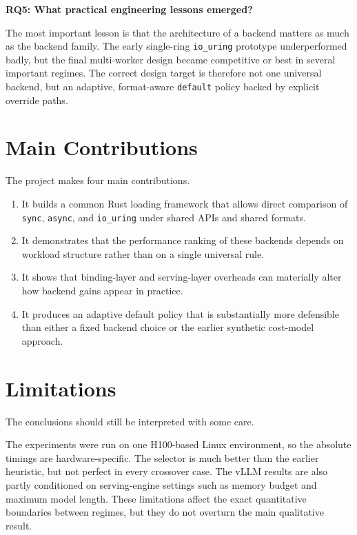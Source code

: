 \textbf{RQ5: What practical engineering lessons emerged?}

The most important lesson is that the architecture of a backend matters as much as the backend family. The early single-ring \texttt{io\_uring} prototype underperformed badly, but the final multi-worker design became competitive or best in several important regimes. The correct design target is therefore not one universal backend, but an adaptive, format-aware \texttt{default} policy backed by explicit override paths.

\section{Main Contributions}

The project makes four main contributions.

\begin{enumerate}
\item It builds a common Rust loading framework that allows direct comparison of \texttt{sync}, \texttt{async}, and \texttt{io\_uring} under shared APIs and shared formats.
\item It demonstrates that the performance ranking of these backends depends on workload structure rather than on a single universal rule.
\item It shows that binding-layer and serving-layer overheads can materially alter how backend gains appear in practice.
\item It produces an adaptive default policy that is substantially more defensible than either a fixed backend choice or the earlier synthetic cost-model approach.
\end{enumerate}

\section{Limitations}

The conclusions should still be interpreted with some care.

The experiments were run on one H100-based Linux environment, so the absolute timings are hardware-specific. The selector is much better than the earlier heuristic, but not perfect in every crossover case. The vLLM results are also partly conditioned on serving-engine settings such as memory budget and maximum model length. These limitations affect the exact quantitative boundaries between regimes, but they do not overturn the main qualitative result.

